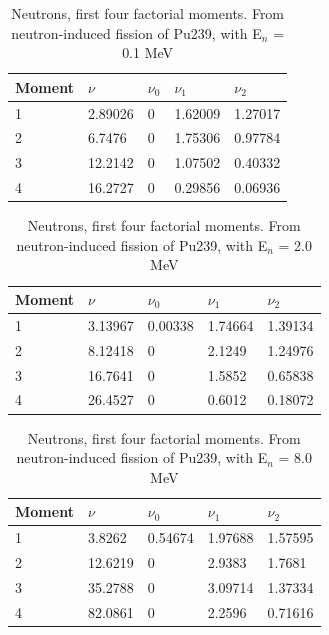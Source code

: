 \documentclass[]{article}
\begin{document}
\begin{table} [H]
	\centering
	\caption{Neutrons, first four factorial moments. From neutron-induced fission of Pu239, with E$_n$ = 0.1 MeV }
	\begin{tabularx}{\textwidth}{XXXXX} \hline
		\label{Pu239_n_moments_0_1}
		Moment & $\nu$ & $\nu_0$ & $\nu_1$ & $\nu_2$ \\ \hline
		1 & 2.89026 & 0 &1.62009 & 1.27017\\
		2 & 6.7476 & 0 & 1.75306 & 0.97784\\
		3 & 12.2142 & 0 & 1.07502 & 0.40332\\
		4 & 16.2727 & 0 & 0.29856 & 0.06936\\ 
	\end{tabularx}
\end{table}

\begin{table} [H]
	\centering
	\caption{Neutrons, first four factorial moments. From neutron-induced fission of Pu239, with E$_n$ = 2.0 MeV }
	\begin{tabularx}{\textwidth}{XXXXX} \hline
		\label{Pu239_n_moments_2}
		Moment & $\nu$ & $\nu_0$ & $\nu_1$ & $\nu_2$ \\ \hline
		1 & 3.13967 & 0.00338 & 1.74664 & 1.39134\\
		2 & 8.12418 & 0 & 2.1249 & 1.24976\\
		3 & 16.7641 & 0 & 1.5852 & 0.65838\\
		4 & 26.4527 & 0 & 0.6012 & 0.18072\\ 
	\end{tabularx}
\end{table}

\begin{table} [H]
	\centering
	\caption{Neutrons, first four factorial moments. From neutron-induced fission of Pu239, with E$_n$ = 8.0 MeV }
	\begin{tabularx}{\textwidth}{XXXXX} \hline
		\label{Pu239_n_moments_8}
		Moment & $\nu$ & $\nu_0$ & $\nu_1$ & $\nu_2$ \\ \hline
		1 & 3.8262 & 0.54674 & 1.97688 & 1.57595\\
		2 & 12.6219 & 0 & 2.9383 & 1.7681\\
		3 & 35.2788 & 0 & 3.09714 & 1.37334\\
		4 & 82.0861 & 0 & 2.2596 & 0.71616\\ 
	\end{tabularx}
\end{table}
\end{document}
